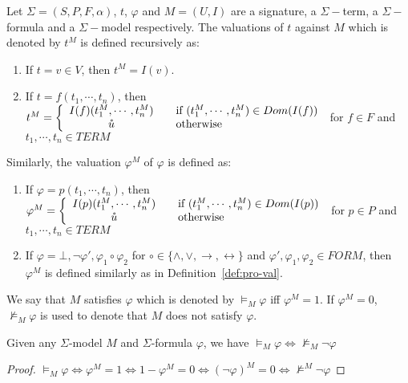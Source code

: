 \begin{definition}
Let $\Sigma = (S, P, F, \alpha)$, $t$, $\varphi$ and $M=(U, I)$ are a signature, a $\Sigma-$term, a $\Sigma-$formula and a $\Sigma-$model respectively. The valuations of $t$ against $M$ which is denoted by $t^M$ is defined recursively as:
\begin{enumerate}
\item If $t = v \in V$, then $t^M = I(v)$.
\item If $t = f(t_1, \cdots, t_n)$, then $t^M = \left\{ 
  \begin{array}{c l}
    I(f)(t_1^M, \cdots, t_n^M) & \quad \text{if } (t_1^M, \cdots, t_n^M) \in Dom(I(f))\\
    \mathring{u} & \quad \text{otherwise }\\
  \end{array} \right.$ for $f \in F$ and $t_1,\cdots, t_n \in TERM$
\end{enumerate}
Similarly, the valuation $\varphi^M$ of $\varphi$ is defined as:
\begin{enumerate}
\item If $\varphi = p(t_1,\cdots,t_n)$, then $\varphi^M = \left\{ 
  \begin{array}{c l}
    I(p)(t_1^M,\cdots,t_n^M) & \quad \text{if } (t_1^M, \cdots, t_n^M) \in Dom(I(p))\\
    \mathring{u} & \quad \text{otherwise }\\
  \end{array} \right.$ for $p \in P$ and $t_1,\cdots, t_n \in TERM$
\item If $\varphi = \bot, \neg\varphi', \varphi_1 \circ \varphi_2$ for $\circ \in \{\wedge, \vee, \rightarrow, \leftrightarrow\}$ and $\varphi', \varphi_1, \varphi_2 \in FORM$, then $\varphi^M$ is defined similarly as in Definition~\ref{def:pro-val}.
\end{enumerate}
We say that $M$ satisfies $\varphi$ which is denoted by $\models_M \varphi$ iff $\varphi^M = 1$. If $\varphi^M = 0$, $\not\models_M \varphi$ is used to denote that $M$ does not satisfy $\varphi$.
\end{definition}

\begin{lemma}\label{lemma:model-sat-unsat}
Given any $\Sigma$-model $M$ and $\Sigma$-formula $\varphi$, we have $\models_M \varphi \iff \not\models_M \neg \varphi$
\end{lemma}

\begin{proof}
$\models_M \varphi \iff \varphi^M = 1 \iff 1 - \varphi^M = 0 \iff (\neg \varphi)^M = 0 \iff \not\models^M \neg \varphi$
\end{proof}

